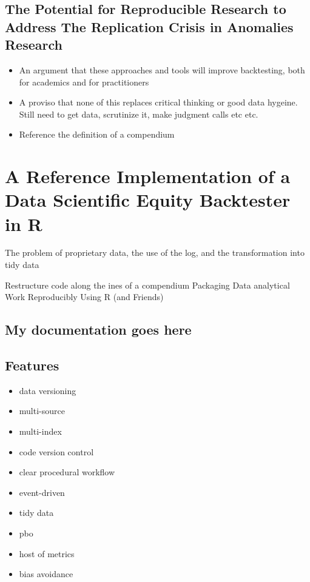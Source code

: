 \documentclass[11pt,preprint, authoryear]{elsarticle}
\numberwithin{equation}{section}
\numberwithin{figure}{section}
\numberwithin{table}{section}
\def\tightlist{} %
\begin{document}
\subsection{The Potential for Reproducible Research to Address The
Replication Crisis in Anomalies
Research}\label{the-potential-for-reproducible-research-to-address-the-replication-crisis-in-anomalies-research}

\begin{itemize}
\tightlist
\item
  An argument that these approaches and tools will improve backtesting,
  both for academics and for practitioners
\item
  A proviso that none of this replaces critical thinking or good data
  hygeine. Still need to get data, scrutinize it, make judgment calls
  etc etc.
\item
  Reference the definition of a compendium
\end{itemize}

\section{\texorpdfstring{A Reference Implementation of a Data Scientific
Equity Backtester in
R\label{Backtester Documentation}}{A Reference Implementation of a Data Scientific Equity Backtester in R}}\label{a-reference-implementation-of-a-data-scientific-equity-backtester-in-r}

The problem of proprietary data, the use of the log, and the
transformation into tidy data

Restructure code along the ines of a compendium Packaging Data
analytical Work Reproducibly Using R (and Friends)

\subsection{My documentation goes
here}\label{my-documentation-goes-here}

\subsection{Features}\label{features}

\begin{itemize}
\tightlist
\item
  data versioning
\item
  multi-source
\item
  multi-index
\item
  code version control
\item
  clear procedural workflow
\item
  event-driven
\item
  tidy data
\item
  pbo
\item
  host of metrics
\item
  bias avoidance
\end{itemize}
\end{document}
